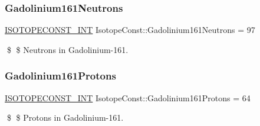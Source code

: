 \subsubsection{\texorpdfstring{Gadolinium161\+Neutrons}{Gadolinium161Neutrons}}
{\footnotesize\ttfamily \mbox{\hyperlink{group___isotope_const-_macros_ga5f18360b3e99483a35c32d789e62621c}{I\+S\+O\+T\+O\+P\+E\+C\+O\+N\+S\+T\+\_\+\+I\+NT}} Isotope\+Const\+::\+Gadolinium161\+Neutrons = 97}

\$ \$ Neutrons in Gadolinium-\/161. \mbox{\label{group___isotope_const-_gadolinium-_gd161_gaa987c972c1c3dfb37872afa54e46f72d}} 
\subsubsection{\texorpdfstring{Gadolinium161\+Protons}{Gadolinium161Protons}}
{\footnotesize\ttfamily \mbox{\hyperlink{group___isotope_const-_macros_ga5f18360b3e99483a35c32d789e62621c}{I\+S\+O\+T\+O\+P\+E\+C\+O\+N\+S\+T\+\_\+\+I\+NT}} Isotope\+Const\+::\+Gadolinium161\+Protons = 64}

\$ \$ Protons in Gadolinium-\/161. 